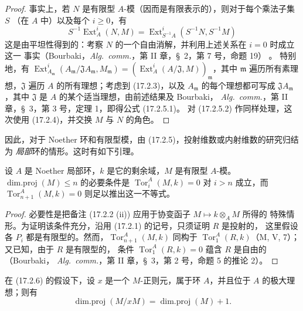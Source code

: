 \begin{proof}
事实上，若 $N$ 是有限型 $A$-模（因而是有限表示的），则对于每个乘法子集 $S$
（在 $A$ 中）以及每个 $i\geq0$，有
\[
  S^{-1}\operatorname{Ext}^i_A(N,M)
  =\operatorname{Ext}^i_{S^{-1}A}(S^{-1}N,S^{-1}M)
\]
这是由平坦性得到的：考察 $N$ 的一个自由消解，并利用上述关系在 $i=0$ 时成立这一
事实（Bourbaki，\emph{Alg.~comm.}，第 II 章，\S~2，第 7 号，命题 19）
。
特别地，有
$\operatorname{Ext}^i_{A_{\mathfrak{m}}}
(A_{\mathfrak{m}}/\mathfrak{J}A_{\mathfrak{m}},M_{\mathfrak{m}})
=(\operatorname{Ext}^i_A(A/\mathfrak{J},M))_{\mathfrak{m}}$，其中
$\mathfrak{m}$ 遍历所有素理想，$\mathfrak{J}$ 遍历 $A$ 的所有理想；考虑到
(17.2.3)，以及
$A_{\mathfrak{m}}$ 的每个理想都可写成 $\mathfrak{J}A_{\mathfrak{m}}$，其中
$\mathfrak{J}$ 是 $A$ 的某个适当理想，由前述结果及 Bourbaki，
\emph{Alg.~comm.}，第 II 章，\S~3，第 3 号，定理 1，即得公式 (17.2.5.1)。
对 (17.2.5.2) 作同样处理，这次使用 (17.2.4)，并交换 $M$ 与 $N$ 的角色。
\end{proof}

因此，对于 Noether 环和有限型模，由 (17.2.5)，投射维数或内射维数的研究归结为
\emph{局部}环的情形。这时有如下引理。

\begin{lemma}[17.2.6]
\label{0.17.2.6-fr}
设 $A$ 是 Noether 局部环，$k$ 是它的剩余域，$M$ 是有限型 $A$-模。
$\operatorname{dim.proj}(M)\leq n$ 的必要条件是
$\operatorname{Tor}^A_i(M,k)=0$ 对 $i>n$ 成立，而
$\operatorname{Tor}^A_{n+1}(M,k)=0$
则足以推出这一不等式。
\end{lemma}

\begin{proof}
必要性是把备注 (17.2.2 (ii)) 应用于协变函子 $M\mapsto k\otimes_A M$ 所得的
特殊情形。为证明该条件充分，沿用 (17.2.1) 的记号，只须证明 $R$ 是投射的，
这里假设各 $P_i$ 都是有限型的。然而，$\operatorname{Tor}^A_{n+1}(M,k)$
同构于 $\operatorname{Tor}^A_1(R,k)$（M, V, 7）；又已知，由于 $R$ 是有限型的，
条件 $\operatorname{Tor}^A_1(R,k)=0$ 蕴含 $R$ 是自由的（Bourbaki，
\emph{Alg.~comm.}，第 II 章，\S~3，第 2 号，命题 5 的推论 2）。
\end{proof}

\begin{corollary}[17.2.7]
\label{0.17.2.7-fr}
在 (17.2.6) 的假设下，设 $x$ 是一个 $M$-正则元，属于环 $A$，并且位于
$A$ 的极大理想；则有
\begin{equation}
\label{0.17.2.7.1-fr}
\tag{17.2.7.1}
  \operatorname{dim.proj}(M/xM)=\operatorname{dim.proj}(M)+1.
\end{equation}
\end{corollary}


